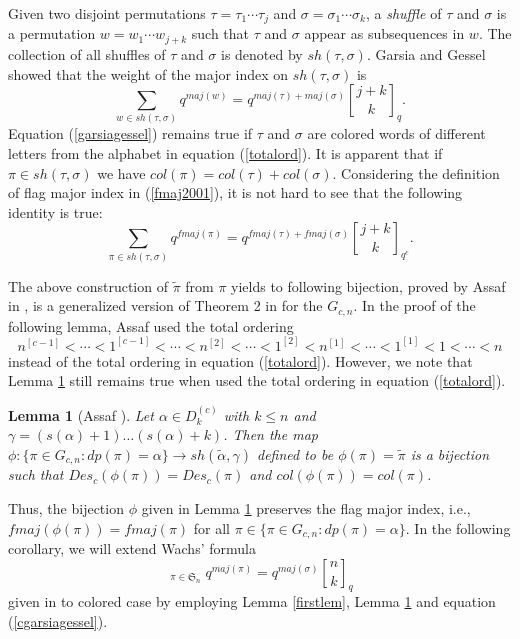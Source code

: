 \documentclass[a4paper,12pt]{article}
\newtheorem{lem}[thm]{Lemma}
\begin{document}
Given two disjoint permutations $\tau= \tau_1\cdots \tau_j$ and $\sigma= \sigma_1\cdots \sigma_k$, a \textit{shuffle} of $\tau$ and $\sigma$ is a permutation $w=w_1\cdots w_{j+k}$ such that $\tau$ and $\sigma$ appear as subsequences in $w$. The collection of all shuffles of $\tau$ and $\sigma$ is denoted by $sh(\tau,\sigma)$. Garsia and Gessel \cite{garsia1979} showed that the weight of the major index on $sh(\tau,\sigma)$ is
\begin{equation}\label{garsiagessel}
\sum_{w \in sh(\tau,\sigma)}q^{maj(w)}=q^{maj(\tau)+maj(\sigma)} \genfrac{[}{]}{0pt}{}{j+k}{k}_q.  
\end{equation}
Equation (\ref{garsiagessel}) remains true if $\tau$ and $\sigma$ are colored words of different letters from the alphabet in equation (\ref{totalord}). It is apparent that if $\pi \in sh(\tau,\sigma)$ we have $col(\pi)=col(\tau)+col(\sigma)$. Considering the definition of flag major index in (\ref{fmaj2001}), it is not hard to see that the following identity is true:
\begin{equation}\label{cgarsiagessel}
\sum_{\pi \in sh(\tau,\sigma)}q^{fmaj(\pi)}=q^{fmaj(\tau)+fmaj(\sigma)} {j+k \brack k}_{q^c}.  
\end{equation}

The above construction of $\tilde{\pi}$ from $\pi$ yields to following bijection, proved by Assaf in \cite{assaf2010}, is a  generalized version of Theorem 2 in \cite{wachs1989} for the $G_{c,n}$. In the proof of the following lemma, Assaf used the total ordering
\begin{equation*}
n^{[c-1]}<\cdots<1^{[c-1]}<\cdots<n^{[2]}<\cdots<1^{[2]}<n^{[1]}<\cdots<1^{[1]}<1<\cdots < n
\end{equation*}
instead of the total ordering in equation (\ref{totalord}). However, we note that Lemma \ref{secondlem} still remains true when used the total ordering in equation (\ref{totalord}).  


\begin{lem} [Assaf \cite{assaf2010}]\label{secondlem}
Let $\alpha \in D_{k}^{(c)}$ with $k \leq n$ and $\gamma=(s(\alpha)+1)\dots (s(\alpha)+k)$. Then the map $\phi: \{\pi \in G_{c,n}: dp(\pi)=\alpha\} \rightarrow sh(\tilde{\alpha},\gamma)$ defined to be $\phi(\pi)=\tilde{\pi}$ is a bijection such that $Des_c(\phi(\pi))=Des_c(\pi)$ and $col(\phi(\pi))=col(\pi)$.
\end{lem}
Thus, the bijection $\phi$ given in Lemma \ref{secondlem} preserves the flag major index, i.e., $fmaj(\phi(\pi))=fmaj(\pi)$ for all $\pi \in \{\pi \in G_{c,n}: dp(\pi)=\alpha\}$. In the following corollary, we will extend Wachs' formula 
$$\mathop{\sum_{dp(\pi)=\sigma}}_{\pi \in \mathfrak{S}_{n}}q^{maj(\pi)}=q^{maj(\sigma)} {n \brack k}_{q}$$
given in \cite{wachs1989} to colored case by employing Lemma \ref{firstlem}, Lemma \ref{secondlem} and equation (\ref{cgarsiagessel}).
\end{document}
